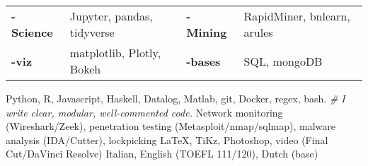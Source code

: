 
\newcommand\D{\rule{0pt}{3.6ex}}
\newcommand\T{\rule{0pt}{2.6ex}} %
\newcommand\B{\rule[-1.2ex]{0pt}{0pt}} %

\begin{cvskills}
    \cvskill{\begin{tabular}{r}Data-\D\end{tabular}}
        {\begin{tabular}{llll}
            {\bf - Science} & Jupyter, pandas, tidyverse & {\bf - Mining} &RapidMiner, bnlearn, arules \T\\
            {\bf-viz} & matplotlib, Plotly, Bokeh    & {\bf-bases} & SQL, mongoDB \B
        \end{tabular}}
        {Python, R, Javascript, Haskell, Datalog, Matlab, git, Docker, regex, bash.
        \hspace*{0.7cm}%
        \emph{\# I write clear, modular, well-commented code.}
        }
        {Network monitoring (Wireshark/Zeek), penetration testing (Metasploit/nmap/sqlmap), malware analysis (IDA/Cutter), lockpicking}
        {\LaTeX, TiKz, Photoshop, video (Final Cut/DaVinci Resolve)}
        {Italian, English (TOEFL 111/120), Dutch (base)}
\end{cvskills}
